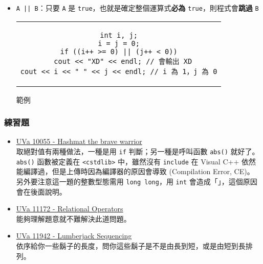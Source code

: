\documentclass[12pt,a4paper,oneside]{article}
\begin{document}
\begin{CJK}{UTF8}{bkai}
\begin{itemize}
\begin{code}[h!]
\centering
\begin{tabular}{c}
\begin{lstlisting}
int i, j;
i = j = 0;
if ((i++ < 0) && (j++ > 0))
  cout << "XD" << endl; // 這行不會輸出
cout << i << " " << j << endl; // i 為 1，j 為 0
\end{lstlisting}
\end{tabular}
\caption{範例}
\label{basic:cpp:code:short:cut}
\end{code}

\item \lstinline!A || B!：只要 \lstinline!A! 是 \lstinline!true!，也就是確定整個運算式\textbf{必為} \lstinline!true!，則程式會\textbf{跳過} \lstinline!B!

\begin{code}[h!]
\centering
\begin{tabular}{c}
\begin{lstlisting}
int i, j;
i = j = 0;
if ((i++ >= 0) || (j++ < 0))
  cout << "XD" << endl; // 會輸出 XD
cout << i << " " << j << endl; // i 為 1，j 為 0
\end{lstlisting}
\end{tabular}
\caption{範例}
\label{basic:cpp:code:short:cut:2}
\end{code}

\end{itemize}

\subsubsection*{練習題}
\begin{itemize}
\item \label{basic:cpp:problem:uva:10055}\href{http://pcshic.github.io/uniDog/problem/p10055/}{UVa 10055 - Hashmat the brave warrior}\\%
取絕對值有兩種做法，一種是用 \lstinline!if! 判斷；另一種是呼叫函數 \lstinline!abs()! 就好了。\lstinline!abs()! 函數被定義在 \lstinline!<cstdlib>! 中，雖然沒有 \lstinline!include! 在 Visual C++ 依然能編譯過，但是上傳時因為編譯器的原因會導致 (Compilation Error, CE)。\\%
另外要注意這一題的整數型態需用 \lstinline!long long!，用 \lstinline!int! 會造成「」，這個原因會在後面說明。
\item \label{basic:cpp:problem:uva:11172}\href{http://pcshic.github.io/uniDog/problem/p11172/}{UVa 11172 - Relational Operators}\\%
能夠理解題意就不難解決此道問題。
\item \label{basic:cpp:problem:uva:11942}\href{http://pcshic.github.io/uniDog/problem/p11942/}{UVa 11942 - Lumberjack Sequencing}\\%
依序給你一些鬍子的長度，問你這些鬍子是不是由長到短，或是由短到長排列。
\end{itemize}


\end{CJK}
\end{document}
